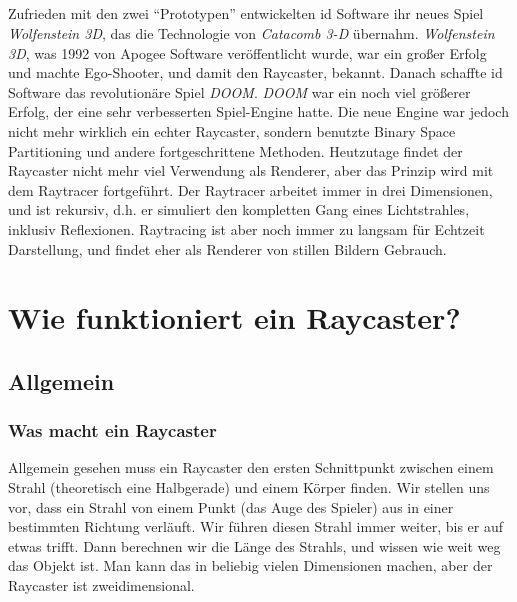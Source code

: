 \documentclass[a4paper,12pt]{report}
\begin{document}
\paragraph*{}
Zufrieden mit den zwei ``Prototypen'' entwickelten id Software ihr neues Spiel \textit{Wolfenstein 3D}, das die Technologie von \textit{Catacomb 3-D} übernahm. \textit{Wolfenstein 3D}, was 1992 von Apogee Software veröffentlicht wurde, war ein großer Erfolg und machte Ego-Shooter, und damit den Raycaster, bekannt. Danach schaffte id Software das revolutionäre Spiel \textit{DOOM}. \textit{DOOM} war ein noch viel größerer Erfolg, der eine sehr verbesserten Spiel-Engine hatte. Die neue Engine war jedoch nicht mehr wirklich ein echter Raycaster, sondern benutzte Binary Space Partitioning und andere fortgeschrittene Methoden. Heutzutage findet der Raycaster nicht mehr viel Verwendung als Renderer, aber das Prinzip wird mit dem Raytracer fortgeführt. Der Raytracer arbeitet immer in drei Dimensionen, und ist rekursiv, d.h. er simuliert den kompletten Gang eines Lichtstrahles, inklusiv Reflexionen. Raytracing ist aber noch immer zu langsam für Echtzeit Darstellung, und findet eher als Renderer von stillen Bildern Gebrauch.

\chapter{Wie funktioniert ein Raycaster?}
\section{Allgemein}

\subsection{Was macht ein Raycaster}
Allgemein gesehen muss ein Raycaster den ersten Schnittpunkt zwischen einem Strahl (theoretisch eine Halbgerade) und einem Körper finden. Wir stellen uns vor, dass ein Strahl von einem Punkt (das Auge des Spieler) aus in einer bestimmten Richtung verläuft. Wir führen diesen Strahl immer weiter, bis er auf etwas trifft. Dann berechnen wir die Länge des Strahls, und wissen wie weit weg das Objekt ist. Man kann das in beliebig vielen Dimensionen machen, aber der Raycaster ist zweidimensional.
\end{document}
